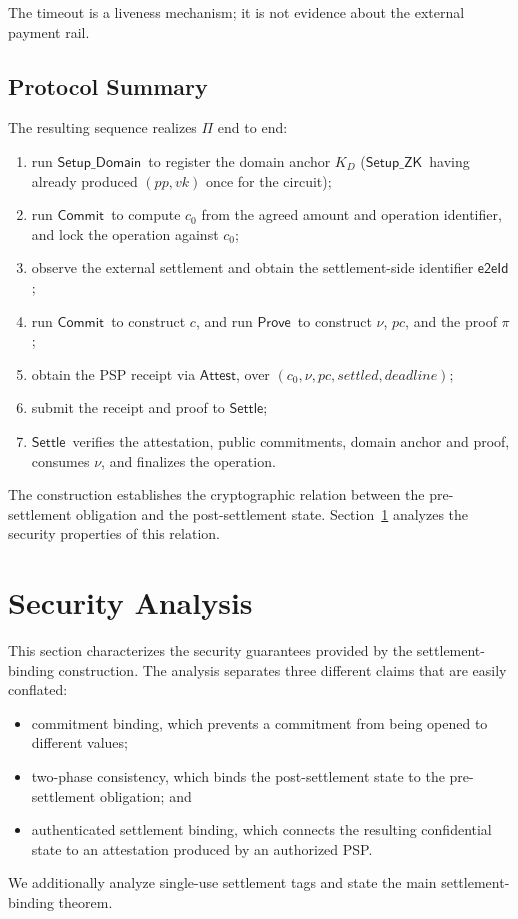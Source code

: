 \documentclass[10pt,twocolumn]{article}
\newcommand{\eeid}{\ensuremath{\mathsf{e2eId}}}
\newcommand{\pc}{\ensuremath{\mathit{pc}}}
\newcommand{\SetupZK}{\ensuremath{\mathsf{Setup\_ZK}}}
\newcommand{\SetupDomain}{\ensuremath{\mathsf{Setup\_Domain}}}
\newcommand{\Commit}{\ensuremath{\mathsf{Commit}}}
\newcommand{\Prove}{\ensuremath{\mathsf{Prove}}}
\newcommand{\Attest}{\ensuremath{\mathsf{Attest}}}
\newcommand{\Settle}{\ensuremath{\mathsf{Settle}}}
\begin{document}
The timeout is a liveness mechanism; it is not evidence about the
external payment rail.

\subsection{Protocol Summary}

The resulting sequence realizes $\Pi$ end to end:
\begin{enumerate}
\item run \SetupDomain\ to register the domain anchor $K_D$ (\SetupZK\
  having already produced $(pp,vk)$ once for the circuit);
\item run \Commit\ to compute $c_0$ from the agreed amount and operation
  identifier, and lock the operation against $c_0$;
\item observe the external settlement and obtain the settlement-side
  identifier \eeid;
\item run \Commit\ to construct $c$, and run \Prove\ to construct $\nu$,
  \pc, and the proof $\pi$;
\item obtain the PSP receipt via \Attest, over
  $(c_0,\nu,\pc,\mathit{settled},\mathit{deadline})$;
\item submit the receipt and proof to \Settle;
\item \Settle\ verifies the attestation, public commitments, domain
  anchor and proof, consumes $\nu$, and finalizes the operation.
\end{enumerate}
The construction establishes the cryptographic relation between the
pre-settlement obligation and the post-settlement state.
Section~\ref{sec:security} analyzes the security properties of this
relation.

\section{Security Analysis}
\label{sec:security}

This section characterizes the security guarantees provided by the
settlement-binding construction. The analysis separates three different
claims that are easily conflated:
\begin{itemize}
\item commitment binding, which prevents a commitment from being opened
  to different values;
\item two-phase consistency, which binds the post-settlement state to the
  pre-settlement obligation; and
\item authenticated settlement binding, which connects the resulting
  confidential state to an attestation produced by an authorized PSP.
\end{itemize}
We additionally analyze single-use settlement tags and state the main
settlement-binding theorem.
\end{document}

